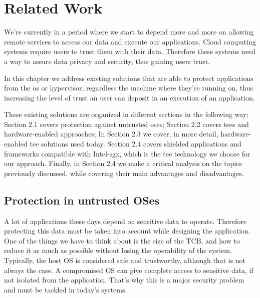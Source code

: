 \chapter{Related Work}
\label{cha:related_work}

We’re currently in a period where we start to depend more and more on allowing remote services to access our data and execute our applications. Cloud computing systems require users to trust them with their data. Therefore these systems need a way to assure data privacy
and security, thus gaining users trust.

In this chapter we address existing solutions that are able to protect applications from the \gls{os} or hypervisor, regardless the machine where they're running on, thus increasing the level of trust an user can deposit in an execution of an application.

These existing solutions are organized in different sections in the following way: 
Section 2.1 covers protection against untrusted \gls{os}es; 
Section 2.2 covers \gls{tee}s and hardware-enabled approaches;
In Section 2.3 we cover, in more detail, hardware-enabled \gls{tee} solutions used today.
Section 2.4 covers shielded applications and frameworks compatible with Intel-\gls{sgx}, which is the \gls{tee} technology we choose for our approach.
Finally, in Section 2.4 we make a critical analysis on the topics previously discussed, while covering their main advantages and disadvantages.





\section{Protection in untrusted OSes}

A lot of applications these days depend on sensitive data to operate. Therefore protecting this data must be taken into account while designing the application. 
One of the things we have to think about is the size of the TCB, and how to reduce it as much as possible without losing the operability of the system. 
Typically, the host OS is considered safe and trustworthy, although that is not always the case. A compromised OS can give complete access to sensitive data, if not isolated from the application. That’s why this is a major security problem and must be tackled in today’s systems.

